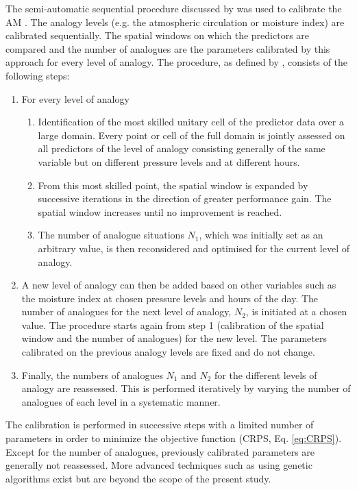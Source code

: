 \documentclass[hess, manuscript]{copernicus}
\begin{document}
	The semi-automatic sequential procedure discussed by \citet{Bontron2004} was used to calibrate the AM \cite{Radanovics2013, BenDaoud2016}. The analogy levels (e.g. the atmospheric circulation or moisture index) are calibrated sequentially. The spatial windows on which the predictors are compared and the number of analogues are the parameters calibrated by this approach for every level of analogy. The procedure, as defined by \citet{Bontron2004}, consists of the following steps:
	
	\begin{enumerate}
		\item For every level of analogy
		\begin{enumerate}
			\item Identification of the most skilled unitary cell of the predictor data over a large domain. Every point or cell of the full domain is jointly assessed on all predictors of the level of analogy consisting generally of the same variable but on different pressure levels and at different hours.
			\item From this most skilled point, the spatial window is expanded by successive iterations in the direction of greater performance gain. The spatial window increases until no improvement is reached.
			\item The number of analogue situations $N_{1}$, which was initially set as an arbitrary value, is then reconsidered and optimised for the current level of analogy.
		\end{enumerate}
		\item A new level of analogy can then be added based on other variables such as the moisture index at chosen pressure levels and hours of the day. The number of analogues for the next level of analogy, $N_{2}$, is initiated at a chosen value. The procedure starts again from step 1 (calibration of the spatial window and the number of analogues) for the new level. The parameters calibrated on the previous analogy levels are fixed and do not change. 
		\item Finally, the numbers of analogues $N_{1}$ and $N_{2}$ for the different levels of analogy are reassessed. This is performed iteratively by varying the number of analogues of each level in a systematic manner.
	\end{enumerate}
	
	The calibration is performed in successive steps with a limited number of parameters in order to minimize the objective function (CRPS, Eq. \ref{eq:CRPS}). Except for the number of analogues, previously calibrated parameters are generally not reassessed. More advanced techniques such as using genetic algorithms \citep{Horton2017} exist but are beyond the scope of the present study.
	
\end{document}
